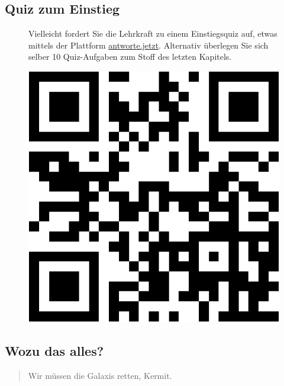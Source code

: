 \documentclass[
  letterpaper,
]{scrbook}
\theoremstyle{definition}
\theoremstyle{definition}
\theoremstyle{definition}
\theoremstyle{remark}
\begin{document}
\subsection{Quiz zum Einstieg}\label{quiz-zum-einstieg}

\begin{figure}

\begin{minipage}{0.80\linewidth}
Vielleicht fordert Sie die Lehrkraft zu einem Einstiegsquiz auf, etwas
mittels der Plattform \href{https://antworte.jetzt/}{antworte.jetzt}.
Alternativ überlegen Sie sich selber 10 Quiz-Aufgaben zum Stoff des
letzten Kapitels.\end{minipage}%
%
\begin{minipage}{0.20\linewidth}

\begin{center}
\includegraphics[width=0.75\linewidth,height=\textheight,keepaspectratio]{040-verbildlichen_files/figure-pdf/unnamed-chunk-3-1.pdf}
\end{center}

\end{minipage}%

\end{figure}%

\subsection{Wozu das alles?}\label{wozu-das-alles}

\begin{quote}
{} Wir müssen die Galaxis retten, Kermit.
\end{quote}
\end{document}
